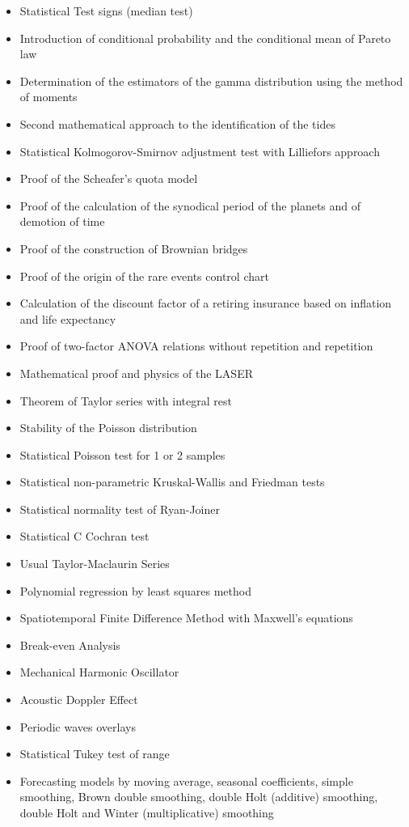 \begin{itemize}
\begin{itemize}[noitemsep]
			\item Statistical Test signs (median test)
			\item Introduction of conditional probability and the conditional mean of Pareto law
			\item Determination of the estimators of the gamma distribution using the method of moments
			\item Second mathematical approach to the identification of the tides
			\item Statistical Kolmogorov-Smirnov adjustment test with Lilliefors approach
			\item Proof of the Scheafer's quota model
			\item Proof of the calculation of the synodical period of the planets and of demotion of time
			\item Proof of the construction of Brownian bridges
			\item Proof of the origin of the rare events control chart
			\item Calculation of the discount factor of a retiring insurance based on inflation and life expectancy
			\item Proof of two-factor ANOVA relations without repetition and repetition
			\item Mathematical proof and physics of the LASER
			\item Theorem of Taylor series with integral rest
			\item Stability of the Poisson distribution
			\item Statistical Poisson test for 1 or 2 samples
			\item Statistical non-parametric Kruskal-Wallis and Friedman tests
			\item Statistical normality test of Ryan-Joiner
			\item Statistical C Cochran test
			\item Usual Taylor-Maclaurin Series
			\item Polynomial regression by least squares method
			\item Spatiotemporal Finite Difference Method with Maxwell's equations
			\item Break-even Analysis
			\item Mechanical Harmonic Oscillator
			\item Acoustic Doppler Effect
			\item Periodic waves overlays
			\item Statistical Tukey test of range
			\item Forecasting models by moving average, seasonal coefficients, simple smoothing, Brown double smoothing, double Holt (additive) smoothing, double Holt and Winter (multiplicative) smoothing

\end{itemize}
\end{itemize}
